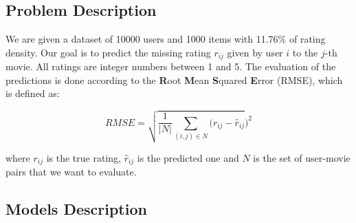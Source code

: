 \documentclass[10pt,conference,compsocconf]{IEEEtran}
\begin{document}
\subsection{Problem Description}

We are given a dataset of 10000 users and 1000 items with 11.76\% of rating density. Our goal is to predict the missing rating $r_{ij}$ given by user $i$ to the $j$-th movie. All ratings are integer numbers between 1 and 5. The evaluation of the predictions is done according to the \textbf{R}oot \textbf{M}ean \textbf{S}quared \textbf{E}rror (RMSE), which is defined as:

$$
RMSE = \sqrt{\frac{1}{\vert N \vert} \sum_{(i,j)\in N} (r_{ij} - \hat{r}_{ij}})^2
$$

\noindent where $r_{ij}$ is the true rating, $\hat{r}_{ij}$ is the predicted one and $N$ is the set of user-movie pairs that we want to evaluate.

\subsection{Models Description}

\end{document}
